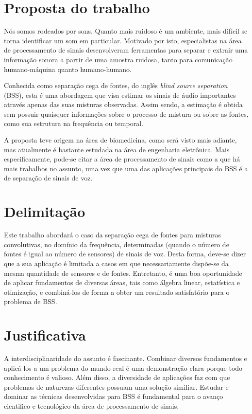 \section{Proposta do trabalho}

Nós somos rodeados por sons. Quanto mais ruidoso é um ambiente, mais difícil se torna identificar um som em particular. Motivado por isto, especialistas na área de processamento de sinais desenvolveram ferramentas para separar e extrair uma informação sonora a partir de uma amostra ruidosa, tanto para comunicação humano-máquina quanto humano-humano. 

Conhecida como separação cega de fontes, do inglês \textit{blind source separation} (BSS), esta é uma abordagem que visa estimar os sinais de áudio importantes através apenas das suas misturas observadas. Assim sendo, a estimação é obtida sem possuir quaisquer informações sobre o processo de mistura ou sobre as fontes, como sua estrutura na frequência ou temporal.

A proposta teve origem na área de biomedicina, como será visto mais adiante, mas atualmente é bastante estudada na área de engenharia eletrônica. Mais especificamente, pode-se citar a área de processamento de sinais como a que há mais trabalhos no assunto, uma vez que uma das aplicações principais do BSS é a de separação de sinais de voz.

\section{Delimitação}

Este trabalho abordará o caso da separação cega de fontes para misturas convolutivas, no domínio da frequência, determinadas (quando o número de fontes é igual ao número de sensores) de sinais de voz. Desta forma, deve-se dizer que a sua aplicação é limitada a casos em que necessariamente dispõe-se da mesma quantidade de sensores e de fontes. Entretanto, é uma boa oportunidade de aplicar fundamentos de diversas áreas, tais como álgebra linear, estatística e otimização, e combiná-los de forma a obter um resultado satisfatório para o problema de BSS.


\section{Justificativa}

A interdisciplinaridade do assunto é fascinante. Combinar diversos fundamentos e aplicá-los a um problema do mundo real é uma demonstração clara porque todo conhecimento é valioso. Além disso, a diversidade de aplicações faz com que problemas de naturezas diferentes possuam uma solução similiar. Estudar e dominar as técnicas desenvolvidas para BSS é fundamental para o avanço cientifico e tecnológico da área de processamento de sinais.


